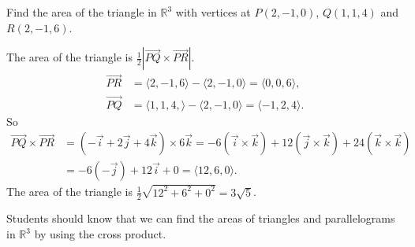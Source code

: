 \documentclass[]{ximera}
\begin{document}
\begin{problem}
Find the area of the triangle in $\mathbb{R}^3$ with vertices at $P(2, -1, 0)$, $Q(1, 1, 4)$ and $R(2, -1, 6)$. 
	\begin{freeResponse}
	The area of the triangle is $\frac{1}{2} | \vec{PQ} \times \vec{PR}|$. 
	\begin{align*}
	\vec{PR} &= \langle 2, -1, 6 \rangle - \langle 2, -1, 0 \rangle = \langle 0, 0, 6 \rangle, \\
	\vec{PQ} &= \langle 1, 1, 4, \rangle - \langle 2, -1, 0 \rangle = \langle -1, 2, 4 \rangle.
	\end{align*}
	So 
	\begin{align*}
	\vec{PQ} \times \vec{PR} &= (-\vec{i} +2\vec{j} +4\vec{k})\times 6\vec{k} = - 6(\vec{i}\times \vec{k}) +12 (\vec{j} \times \vec{k}) +24 (\vec{k}\times \vec{k}) \\ &= - 6(-\vec{j}) + 12 \vec{i} + 0 = \langle 12, 6, 0 \rangle.
	\end{align*}
	The area of the triangle is $\frac{1}{2} \sqrt{12^2+6^2+0^2} = 3\sqrt{5}$. 
	\end{freeResponse}
		
\end{problem}

\begin{instructorNotes}
Students should know that we can find the areas of triangles and parallelograms in $\mathbb{R}^3$ by using the cross product.
\end{instructorNotes}
\end{document}
